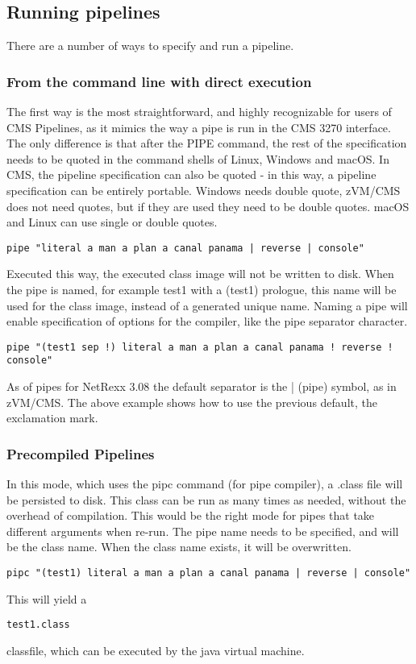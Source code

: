 \subsection{Running pipelines}
There are a number of ways to specify and run a pipeline.
\subsubsection{From the command line with direct execution}
The first way is the most straightforward, and highly recognizable for
users of CMS Pipelines, as it mimics the way a pipe is run in the CMS
3270 interface. The only difference is that after the PIPE command,
the rest of the specification needs to be quoted in the command shells
of Linux, Windows and macOS. In CMS, the pipeline specification can
also be quoted - in this way, a pipeline specification can be entirely
portable. Windows needs double quote, zVM/CMS does not need quotes,
but if they are used they need to be double quotes. macOS and Linux
can use single or double quotes.
\begin{verbatim}
pipe "literal a man a plan a canal panama | reverse | console"
\end{verbatim}
Executed this way, the executed class image will not be written to disk. When the pipe is named, for example test1 with a (test1) prologue, this name will be used for the class image, instead of a generated unique name. Naming a pipe will enable specification of options for the compiler, like the pipe separator character.
\begin{verbatim}
pipe "(test1 sep !) literal a man a plan a canal panama ! reverse !
console"
\end{verbatim}
As of pipes for NetRexx 3.08 the default separator is the | (pipe)
symbol, as in zVM/CMS. The above example shows how to use the previous
default, the exclamation mark.
\subsubsection{Precompiled Pipelines}
In this mode, which uses the pipc command (for pipe compiler), a .class file will be persisted to disk. This class can be run as many times as needed, without the overhead of compilation. This would be the right mode for pipes that take different arguments when re-run.
The pipe name needs to be specified, and will be the class name. When
the class name exists, it will be overwritten.
\begin{verbatim}
pipc "(test1) literal a man a plan a canal panama | reverse | console"
\end{verbatim}
This will yield a \begin{alltt}test1.class\end{alltt} classfile, which
can be executed by the java virtual machine.

